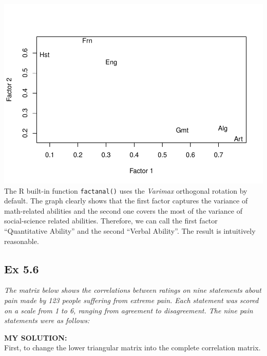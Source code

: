 \documentclass[
]{article}
\begin{document}
\includegraphics{HUDM6122-Homework_05-Chenguang-Pan_files/figure-latex/unnamed-chunk-12-1.pdf}
The R built-in function \texttt{factanal()} uses the \emph{Varimax}
orthogonal rotation by default. The graph clearly shows that the first
factor captures the variance of math-related abilities and the second
one covers the most of the variance of social-science related abilities.
Therefore, we can call the first factor ``Quantitative Ability'' and the
second ``Verbal Ability''. The result is intuitively reasonable.

\hypertarget{ex-5.6}{%
\subsection{Ex 5.6}\label{ex-5.6}}

\emph{The matrix below shows the correlations between ratings on nine
statements about pain made by 123 people suffering from extreme pain.
Each statement was scored on a scale from 1 to 6, ranging from agreement
to disagreement. The nine pain statements were as follows:}

\textbf{MY SOLUTION:}\\
First, to change the lower triangular matrix into the complete
correlation matrix.
\end{document}
